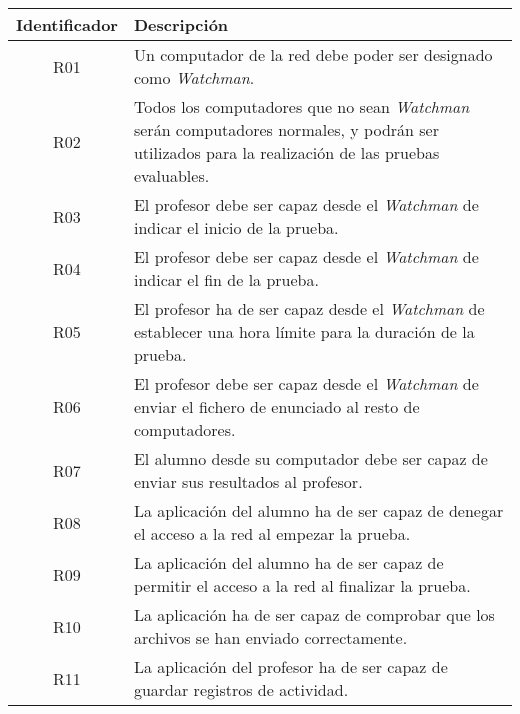 \begin{tabular}{|c|l|}
    \hline
    \textbf{Identificador} & \textbf{Descripción} 
    \\ \hline
  
    R01 & Un computador de la red debe poder ser designado como \emph{Watchman}.
    \\ \hline
    
    R02 & Todos los computadores que no sean \emph{Watchman} serán computadores
    normales, y podrán ser utilizados para la realización de las pruebas evaluables.
    \\ \hline
    
    R03 & El profesor debe ser capaz desde el \emph{Watchman} de indicar el inicio de la prueba.
    \\ \hline
    
    R04 & El profesor debe ser capaz desde el \emph{Watchman} de indicar el fin de la prueba.
    \\ \hline

    R05 & El profesor ha de ser capaz desde el \emph{Watchman} de establecer una hora límite para la duración de la prueba.
    \\ \hline

    R06 & El profesor debe ser capaz desde el \emph{Watchman} de enviar el fichero de enunciado al resto de computadores.
    \\ \hline
    
    R07 & El alumno desde su computador debe ser capaz de enviar sus resultados al profesor.
    \\ \hline
    
    R08 & La aplicación del alumno ha de ser capaz de denegar el acceso a la red al empezar la prueba.
    \\ \hline
    
    R09 & La aplicación del alumno ha de ser capaz de permitir el acceso a la red al finalizar la prueba.
    \\ \hline
    
    R10 & La aplicación ha de ser capaz de comprobar que los archivos se han enviado correctamente.
    \\ \hline
    
    R11 & La aplicación del profesor ha de ser capaz de guardar registros de actividad.
    \\ \hline
    
\end{tabular}